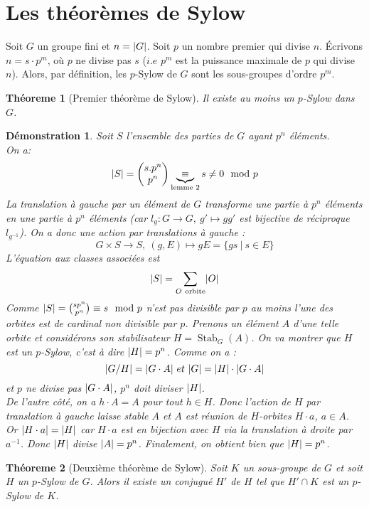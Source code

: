 \documentclass[a4paper, oneside]{report}
\theoremstyle{break}
\newtheorem{thm}{Théoreme}[section] %
\newtheorem*{demonstration}{Démonstration}
\newcommand{\sgs}{sous-groupes }
\newcommand{\x}{\times}
\DeclarePairedDelimiter\abs{\lvert}{\rvert}%
\DeclareMathOperator{\Stab}{Stab}
\newcommand{\ub}{\underbrace}
\begin{document}
\section{Les théorèmes de Sylow}

Soit $G$ un groupe fini et $n = \abs{G}$. Soit $p$ un nombre premier qui divise $n$. Écrivons $n = s \cdot p^m$, où $p$ ne divise pas $s$ ($i.e$ $p^m$ est la puissance maximale de $p$ qui divise $n$). Alors, par définition, les $p$-Sylow de $G$ sont les \sgs d'ordre $p^m$.

\begin{thm}[Premier théorème de Sylow]
Il existe au moins un $p$-Sylow dans $G$.
\end{thm}

\begin{demonstration}
Soit $S$ l'ensemble des parties de $G$ ayant $p^n$ éléments.\\
On a:
\[
\abs{S} = 
\begin{pmatrix}
s.p^n		\\	p^n
\end{pmatrix} 
\ub{\equiv}_{\text{lemme 2}} s \neq 0 \mod p
\]
La translation à gauche par un élément de $G$ transforme une partie à $p^n$ éléments en une partie à $p^n$ éléments (car $l_g : G\rightarrow G,~g'\mapsto gg'$ est bijective de réciproque $l_{g^{-1}}$). On a donc une action par translations à gauche :
$$G\x S \rightarrow S,~(g,E)\mapsto gE = \{gs~|~s\in E\}$$
L'équation aux classes associées est
\[
\abs{S} = \sum_{O~\text{orbite}} \abs{O}
\]
Comme $\abs{S}=\binom{sp^n}{p^n}\equiv s \mod p$ n'est pas divisible par $p$ au moins l'une des orbites est de cardinal non divisible par $p$. Prenons un élément $A$ d'une telle orbite et considérons son stabilisateur $H = \Stab_G(A)$. On va montrer que $H$ est un $p$-Sylow, c'est à dire $\abs{H} = p^n$. Comme on a :
$$\abs{G/H} = \abs{G\cdot A}~et~\abs{G}=\abs{H}\cdot\abs{G\cdot A}$$
et $p$ ne divise pas $\abs{G\cdot A}$, $p^n$ doit diviser $\abs{H}$.\\
De l'autre côté, on a $h\cdot A = A$ pour tout $h\in H$. Donc l'action de $H$ par translation à gauche laisse stable $A$ et $A$ est réunion de $H$-orbites $H\cdot a$, $a \in A$.\\
Or $\abs{H\cdot a}=\abs{H}$ car $H\cdot a$ est en bijection avec $H$ via la translation à droite par $a^{-1}$.
Donc $\abs{H}$ divise $\abs{A} = p^n$. Finalement, on obtient bien que $\abs{H} = p^n$.
\end{demonstration}

\begin{thm}[Deuxième théorème de Sylow]
Soit $K$ un sous-groupe de $G$ et soit $H$ un $p$-Sylow de $G$. Alors il existe un conjugué $H'$ de $H$ tel que $H' \cap K$ est un $p$-Sylow de $K$.
\end{thm}
\end{document}
